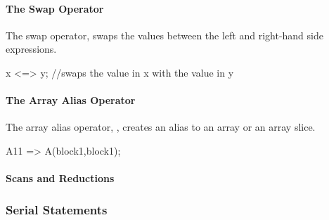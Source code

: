 \paragraph{The Swap Operator}
The swap operator, \chpl{<=>} swaps the values between
the left and right-hand side expressions.
\begin{chapel}
x <=> y; //swaps the value in x with the value in y
\end{chapel}

\paragraph{The Array Alias Operator}
The array alias operator, \chpl{=>}, creates an alias
to an array or an array slice.
\begin{chapel}
A11 => A(block1,block1);
\end{chapel}

\paragraph{Scans and Reductions}

\subsubsection{Serial Statements}

